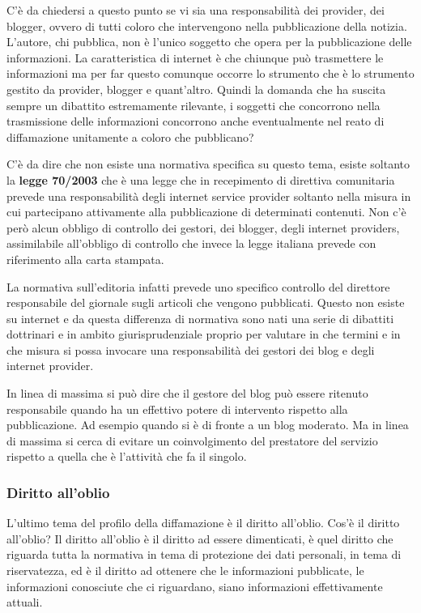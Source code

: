 C'è da chiedersi a questo punto se vi sia una responsabilità dei provider, dei blogger, ovvero di tutti coloro che intervengono nella pubblicazione della notizia. L'autore, chi pubblica, non è l'unico soggetto che opera per la pubblicazione delle informazioni. La caratteristica di internet è che chiunque può trasmettere le informazioni ma per far questo comunque occorre lo strumento che è lo strumento gestito da provider, blogger e quant'altro. Quindi la domanda che ha suscita sempre un dibattito estremamente rilevante, i soggetti che concorrono nella trasmissione delle informazioni concorrono anche eventualmente nel reato di diffamazione unitamente a coloro che pubblicano?

C'è da dire che non esiste una normativa specifica su questo tema, esiste soltanto la \textbf{legge 70/2003} che è una legge che in recepimento di direttiva comunitaria prevede una responsabilità degli internet service provider soltanto nella misura in cui partecipano attivamente alla pubblicazione di determinati contenuti. Non c'è però alcun obbligo di controllo dei gestori, dei blogger, degli internet providers, assimilabile all'obbligo di controllo che invece la legge italiana prevede con riferimento alla carta stampata.

La normativa sull'editoria infatti prevede uno specifico controllo del direttore responsabile del giornale sugli articoli che vengono pubblicati. Questo non esiste su internet e da questa differenza di normativa sono nati una serie di dibattiti dottrinari e in ambito giurisprudenziale proprio per valutare in che termini e in che misura si possa invocare una responsabilità dei gestori dei blog e degli internet provider.

In linea di massima si può dire che il gestore del blog può essere ritenuto responsabile quando ha un effettivo potere di intervento rispetto alla pubblicazione. Ad esempio quando si è di fronte a un blog moderato. Ma in linea di massima si cerca di evitare un coinvolgimento del prestatore del servizio rispetto a quella che è l'attività che fa il singolo.

\subsubsection{Diritto all'oblio}

L'ultimo tema del profilo della diffamazione è il diritto all'oblio. Cos'è il diritto all'oblio? Il diritto all'oblio è il diritto ad essere dimenticati, è quel diritto che riguarda tutta la normativa in tema di protezione dei dati personali, in tema di riservatezza, ed è il diritto ad ottenere che le informazioni pubblicate, le informazioni conosciute che ci riguardano, siano informazioni effettivamente attuali.

